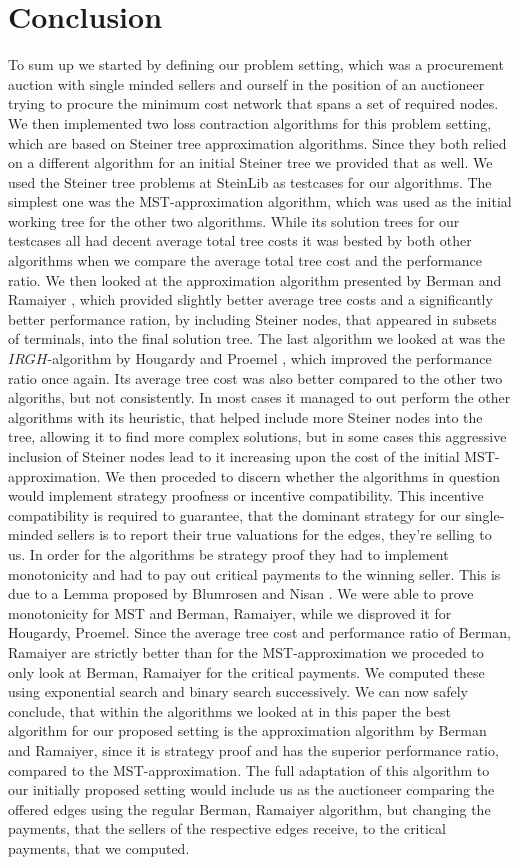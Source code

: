
\chapter{Conclusion}\label{chapter:conclusion}

To sum up we started by defining our problem setting, which was a procurement auction with single minded sellers and ourself in the position of an auctioneer trying to procure the minimum cost network that spans a set of required nodes. We then implemented two loss contraction algorithms for this problem setting, which are based on Steiner tree approximation algorithms. Since they both relied on a different algorithm for an initial Steiner tree we provided that as well. We used the Steiner tree problems at SteinLib \cite{Dui93} as testcases for our algorithms. The simplest one was the MST-approximation algorithm, which was used as the initial working tree for the other two algorithms. While its solution trees for our testcases all had decent average total tree costs it was bested by both other algorithms when we compare the average total tree cost and the performance ratio. We then looked at the approximation algorithm presented by Berman and Ramaiyer \cite{BeRa94}, which provided slightly better average tree costs and a significantly better performance ration, by including Steiner nodes, that appeared in subsets of terminals, into the final solution tree. The last algorithm we looked at was the $IRGH$-algorithm by Hougardy and Proemel \cite{HoPr99}, which improved the performance ratio once again. Its average tree cost was also better compared to the other two algoriths, but not consistently. In most cases it managed to out perform the other algorithms with its heuristic, that helped include more Steiner nodes into the tree, allowing it to find more complex solutions, but in some cases this aggressive inclusion of Steiner nodes lead to it increasing upon the cost of the initial MST-approximation. We then proceded to discern whether the algorithms in question would implement strategy proofness or incentive compatibility. This incentive compatibility is required to guarantee, that the dominant strategy for our single-minded sellers is to report their true valuations for the edges, they're selling to us. In order for the algorithms be strategy proof they had to implement monotonicity and had to pay out critical payments to the winning seller. This is due to a Lemma proposed by Blumrosen and Nisan \cite{BlNi07}. We were able to prove monotonicity for MST and Berman, Ramaiyer, while we disproved it for Hougardy, Proemel. Since the average tree cost and performance ratio of Berman, Ramaiyer are strictly better than for the MST-approximation we proceded to only look at Berman, Ramaiyer for the critical payments. We computed these using exponential search and binary search successively. We can now safely conclude, that within the algorithms we looked at in this paper the best algorithm for our proposed setting is the approximation algorithm by Berman and Ramaiyer, since it is strategy proof and has the superior performance ratio, compared to the MST-approximation. The full adaptation of this algorithm to our initially proposed setting would include us as the auctioneer comparing the offered edges using the regular Berman, Ramaiyer algorithm, but changing the payments, that the sellers of the respective edges receive, to the critical payments, that we computed.  